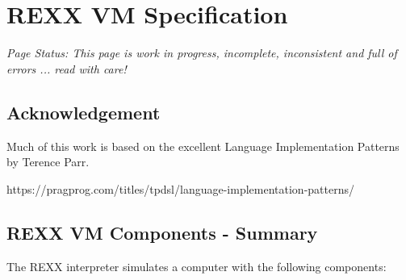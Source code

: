\section{REXX VM Specification}

\emph{Page Status: This page is work in progress, incomplete, inconsistent and full of errors ... read with care!}

\subsection{Acknowledgement}

Much of this work is based on the excellent \textquotedbl{}Language Implementation Patterns\textquotedbl{}
by Terence Parr.

https://pragprog.com/titles/tpdsl/language-implementation-patterns/

\subsection{REXX VM Components - Summary}

The REXX interpreter simulates a computer with the following components:

